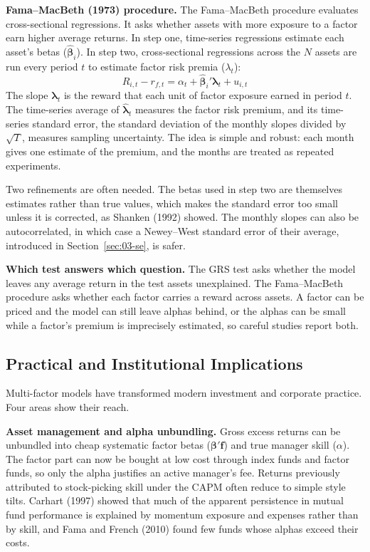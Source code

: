 \textbf{Fama--MacBeth (1973) procedure.} The Fama--MacBeth procedure evaluates cross-sectional regressions. It asks whether assets with more exposure to a factor earn higher average returns. In step one, time-series regressions estimate each asset's betas ($\hat{\boldsymbol{\beta}}_i$). In step two, cross-sectional regressions across the $N$ assets are run every period $t$ to estimate factor risk premia ($\lambda_t$):
\begin{equation}
  R_{i,t} - r_{f,t} = \alpha_t + \hat{\boldsymbol{\beta}}_i' \boldsymbol{\lambda}_t + u_{i,t}
  \label{eq:03-fmb}
\end{equation}
The slope $\boldsymbol{\lambda}_t$ is the reward that each unit of factor exposure earned in period $t$. The time-series average of $\hat{\boldsymbol{\lambda}}_t$ measures the factor risk premium, and its time-series standard error, the standard deviation of the monthly slopes divided by $\sqrt{T}$, measures sampling uncertainty. The idea is simple and robust: each month gives one estimate of the premium, and the months are treated as repeated experiments.

Two refinements are often needed. The betas used in step two are themselves estimates rather than true values, which makes the standard error too small unless it is corrected, as Shanken (1992) showed. The monthly slopes can also be autocorrelated, in which case a Newey--West standard error of their average, introduced in Section~\ref{sec:03-se}, is safer.

\textbf{Which test answers which question.} The GRS test asks whether the model leaves any average return in the test assets unexplained. The Fama--MacBeth procedure asks whether each factor carries a reward across assets. A factor can be priced and the model can still leave alphas behind, or the alphas can be small while a factor's premium is imprecisely estimated, so careful studies report both.

\subsection{Practical and Institutional Implications}
\label{sec:03-implications}
Multi-factor models have transformed modern investment and corporate practice. Four areas show their reach.

\textbf{Asset management and alpha unbundling.} Gross excess returns can be unbundled into cheap systematic factor betas ($\boldsymbol{\beta}' \mathbf{f}$) and true manager skill ($\alpha$). The factor part can now be bought at low cost through index funds and factor funds, so only the alpha justifies an active manager's fee. Returns previously attributed to stock-picking skill under the CAPM often reduce to simple style tilts. Carhart (1997) showed that much of the apparent persistence in mutual fund performance is explained by momentum exposure and expenses rather than by skill, and Fama and French (2010) found few funds whose alphas exceed their costs.

